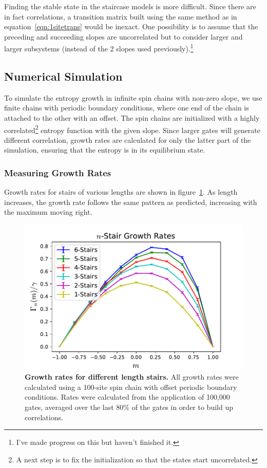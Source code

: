 Finding the stable state in the staircase models is more difficult. Since there are in fact correlations, a transition matrix built using the same method as in equation~\ref{eqn:1sitetrans} would be inexact. One possibility is to assume that the preceding and succeeding slopes are uncorrelated but to consider larger and larger subsystems (instead of the 2 slopes used previously).\footnote{I've made progress on this but haven't finished it.}

\subsection{Numerical Simulation} \emph{}\label{sub:num}

To simulate the entropy growth in infinite spin chains with non-zero slope, we use finite chains with periodic boundary conditions, where one end of the chain is attached to the other with an offset. The spin chains are initialized with a highly correlated\footnote{A next step is to fix the initialization so that the states start uncorrelated.} entropy function with the given slope. Since larger gates will generate different correlation, growth rates are calculated for only the latter part of the simulation, ensuring that the entropy is in its equilibrium state.

\subsubsection{Measuring Growth Rates} \emph{} \label{subsub:growthrates}

Growth rates for stairs of various lengths are shown in figure~\ref{fig:compareRates}. As length increases, the growth rate follows the same pattern as predicted, increasing with the maximum moving right. 
\begin{figure}
	\centering
	\includegraphics[width=.5\textwidth]{compareRates.pdf}
	\caption{\textbf{Growth rates for different length stairs.} All growth rates were calculated using a 100-site spin chain with offset periodic boundary conditions. Rates were calculated from the application of 100,000 gates, averaged over the last 80\% of the gates in order to build up correlations.}
	\label{fig:compareRates}
\end{figure}

